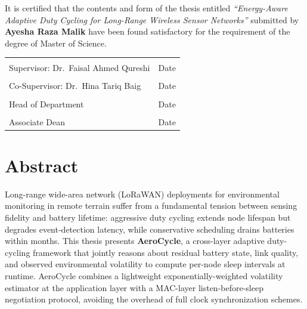 \documentclass[12pt,a4paper]{report}
\begin{document}
\noindent It is certified that the contents and form of the thesis entitled
\emph{``Energy-Aware Adaptive Duty Cycling for Long-Range Wireless Sensor Networks''}
submitted by \textbf{Ayesha Raza Malik} have been found satisfactory for the requirement of
the degree of Master of Science.

\vspace{30pt}

\noindent
\begin{tabular}{@{}p{7cm}p{7cm}@{}}
\dotfill & \dotfill \\
Supervisor: Dr.\ Faisal Ahmed Qureshi & Date \\[26pt]
\dotfill & \dotfill \\
Co-Supervisor: Dr.\ Hina Tariq Baig & Date \\[26pt]
\dotfill & \dotfill \\
Head of Department & Date \\[26pt]
\dotfill & \dotfill \\
Associate Dean & Date \\
\end{tabular}

\chapter*{Abstract}
\thispagestyle{plain}

\noindent Long-range wide-area network (LoRaWAN) deployments for environmental monitoring
in remote terrain suffer from a fundamental tension between sensing fidelity and battery
lifetime: aggressive duty cycling extends node lifespan but degrades event-detection
latency, while conservative scheduling drains batteries within months. This thesis presents
\textbf{AeroCycle}, a cross-layer adaptive duty-cycling framework that jointly reasons about
residual battery state, link quality, and observed environmental volatility to compute
per-node sleep intervals at runtime. AeroCycle combines a lightweight exponentially-weighted
volatility estimator at the application layer with a MAC-layer listen-before-sleep
negotiation protocol, avoiding the overhead of full clock synchronization schemes.
\end{document}
